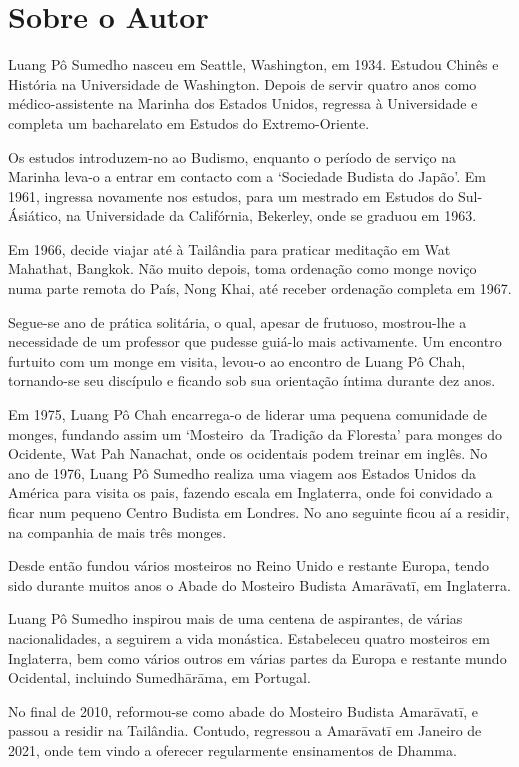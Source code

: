 \chapter{Sobre o Autor}

Luang Pô Sumedho nasceu em Seattle, Washington, em 1934. Estudou Chinês e
História na Universidade de Washington. Depois de servir quatro anos como
médico-assistente na Marinha dos Estados Unidos, regressa à Universidade e
completa um bacharelato em Estudos do Extremo-Oriente.

Os estudos introduzem-no ao Budismo, enquanto o período de serviço na Marinha
leva-o a entrar em contacto com a `Sociedade Budista do Japão'. Em 1961,
ingressa novamente nos estudos, para um mestrado em Estudos do Sul-Ásiático, na
Universidade da Califórnia, Bekerley, onde se graduou em 1963.

Em 1966, decide viajar até à Tailândia para praticar meditação em Wat Mahathat,
Bangkok. Não muito depois, toma ordenação como monge noviço numa parte remota do
País, Nong Khai, até receber ordenação completa em 1967.

Segue-se ano de prática solitária, o qual, apesar de frutuoso, mostrou-lhe a
necessidade de um professor que pudesse guiá-lo mais activamente. Um encontro
furtuito com um monge em visita, levou-o ao encontro de Luang Pô Chah,
tornando-se seu discípulo e ficando sob sua orientação íntima durante dez anos.

Em 1975, Luang Pô Chah encarrega-o de liderar uma pequena comunidade de monges,
fundando assim um `\mbox{Mosteiro}~da Tradição da Floresta' para monges do Ocidente,
Wat Pah Nanachat, onde os ocidentais podem treinar em inglês. No ano de 1976,
Luang Pô Sumedho realiza uma viagem aos Estados Unidos da América para visita os
pais, fazendo escala em Inglaterra, onde foi convidado a ficar num pequeno
Centro Budista em Londres. No ano seguinte ficou aí a residir, na companhia de
mais três monges.

Desde então fundou vários mosteiros no Reino Unido e restante Europa, tendo sido
durante muitos anos o Abade do Mosteiro Budista Amarāvatī, em Inglaterra.

Luang Pô Sumedho inspirou mais de uma centena de aspirantes, de várias
nacionalidades, a seguirem a vida monástica. Estabeleceu quatro mosteiros em
Inglaterra, bem como vários outros em várias partes da Europa e restante mundo
Ocidental, incluindo Sumedhārāma, em Portugal.

No final de 2010, reformou-se como abade do Mosteiro Budista Amarāvatī, e passou
a residir na Tailândia. Contudo, regressou a Amarāvatī em Janeiro de 2021, onde
tem vindo a oferecer regularmente ensinamentos de Dhamma.
